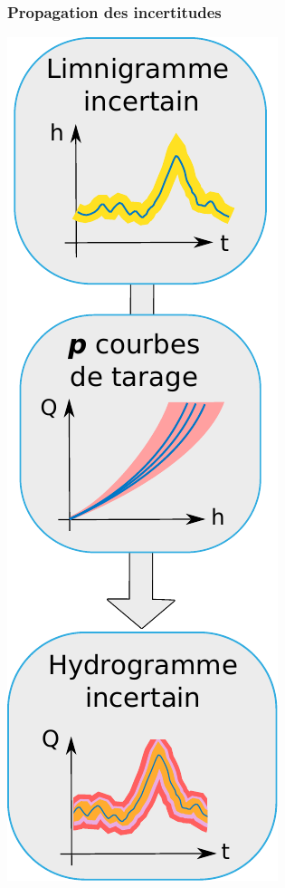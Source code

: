 \documentclass[compress,9pt]{beamer}
\begin{document}
	\begin{frame}
		\frametitle{Propagation des incertitudes}
		\begin{minipage}{0.2\textwidth}
			\includegraphics[width = .9\textwidth]{./Figures/SchemaHydrog.pdf} 

\end{minipage}
\end{frame}
\end{document}
